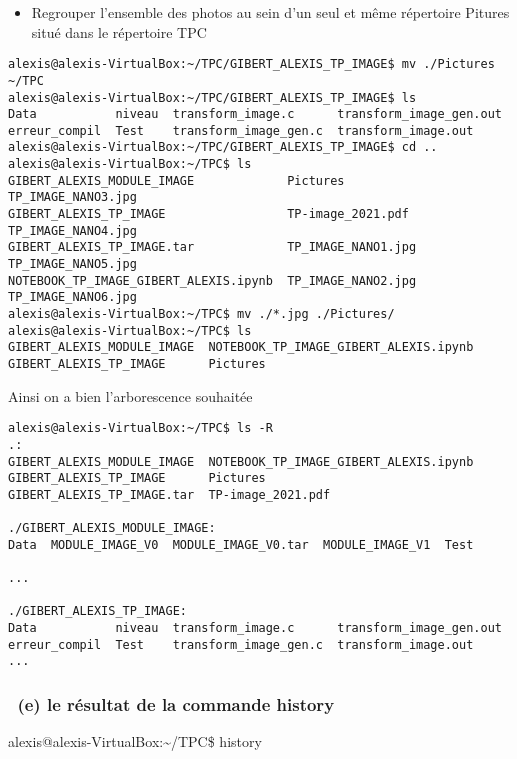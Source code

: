 \documentclass[11pt]{article}
\providecommand{\tightlist}{%
      \setlength{\itemsep}{0pt}\setlength{\parskip}{0pt}}
\begin{document}
\begin{itemize}
\tightlist
\item
  Regrouper l'ensemble des photos au sein d'un seul et même répertoire
  Pitures situé dans le répertoire TPC
\end{itemize}

\begin{verbatim}
alexis@alexis-VirtualBox:~/TPC/GIBERT_ALEXIS_TP_IMAGE$ mv ./Pictures ~/TPC
alexis@alexis-VirtualBox:~/TPC/GIBERT_ALEXIS_TP_IMAGE$ ls
Data           niveau  transform_image.c      transform_image_gen.out
erreur_compil  Test    transform_image_gen.c  transform_image.out
alexis@alexis-VirtualBox:~/TPC/GIBERT_ALEXIS_TP_IMAGE$ cd ..
alexis@alexis-VirtualBox:~/TPC$ ls
GIBERT_ALEXIS_MODULE_IMAGE             Pictures            TP_IMAGE_NANO3.jpg
GIBERT_ALEXIS_TP_IMAGE                 TP-image_2021.pdf   TP_IMAGE_NANO4.jpg
GIBERT_ALEXIS_TP_IMAGE.tar             TP_IMAGE_NANO1.jpg  TP_IMAGE_NANO5.jpg
NOTEBOOK_TP_IMAGE_GIBERT_ALEXIS.ipynb  TP_IMAGE_NANO2.jpg  TP_IMAGE_NANO6.jpg
alexis@alexis-VirtualBox:~/TPC$ mv ./*.jpg ./Pictures/
alexis@alexis-VirtualBox:~/TPC$ ls
GIBERT_ALEXIS_MODULE_IMAGE  NOTEBOOK_TP_IMAGE_GIBERT_ALEXIS.ipynb
GIBERT_ALEXIS_TP_IMAGE      Pictures
\end{verbatim}

Ainsi on a bien l'arborescence souhaitée

\begin{verbatim}
alexis@alexis-VirtualBox:~/TPC$ ls -R
.:
GIBERT_ALEXIS_MODULE_IMAGE  NOTEBOOK_TP_IMAGE_GIBERT_ALEXIS.ipynb
GIBERT_ALEXIS_TP_IMAGE      Pictures
GIBERT_ALEXIS_TP_IMAGE.tar  TP-image_2021.pdf

./GIBERT_ALEXIS_MODULE_IMAGE:
Data  MODULE_IMAGE_V0  MODULE_IMAGE_V0.tar  MODULE_IMAGE_V1  Test

...

./GIBERT_ALEXIS_TP_IMAGE:
Data           niveau  transform_image.c      transform_image_gen.out
erreur_compil  Test    transform_image_gen.c  transform_image.out
...
\end{verbatim}

\subsubsection{~(e) le résultat de la commande
history}\label{e-le-ruxe9sultat-de-la-commande-history}

alexis@alexis-VirtualBox:\textasciitilde{}/TPC\$ history
\end{document}
